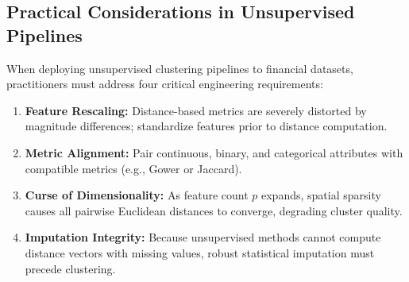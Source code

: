 \subsection{Practical Considerations in Unsupervised Pipelines}
When deploying unsupervised clustering pipelines to financial datasets, practitioners must address four critical engineering requirements:
\begin{enumerate}
    \item \textbf{Feature Rescaling:} Distance-based metrics are severely distorted by magnitude differences; standardize features prior to distance computation.
    \item \textbf{Metric Alignment:} Pair continuous, binary, and categorical attributes with compatible metrics (e.g., Gower or Jaccard).
    \item \textbf{Curse of Dimensionality:} As feature count $p$ expands, spatial sparsity causes all pairwise Euclidean distances to converge, degrading cluster quality.
    \item \textbf{Imputation Integrity:} Because unsupervised methods cannot compute distance vectors with missing values, robust statistical imputation must precede clustering.
\end{enumerate}
